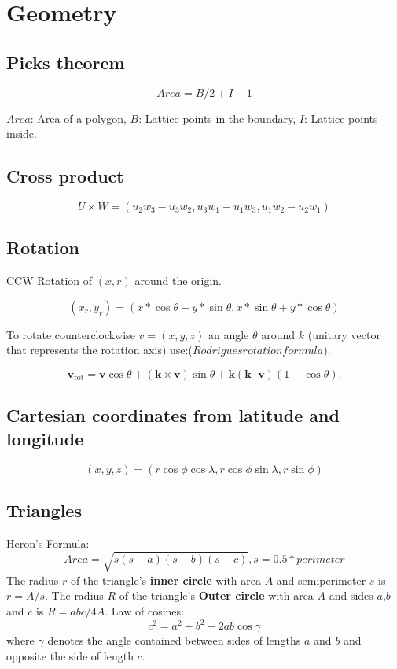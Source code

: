 \documentclass[10pt,letterpaper,twocolumn,twosided]{article}
\begin{document}
\section{Geometry}

\subsection{Picks theorem}

\[ Area = B/2 + I - 1 \]

$Area$: Area of a polygon, $B$: Lattice points in the boundary, $I$: Lattice points inside.


\subsection{Cross product}

\[ U \times W = (u_2 w_3 - u_3 w_2, u_3 w_1 - u_1 w_3, u_1 w_2 - u_2 w_1) \]

\subsection{Rotation}

CCW Rotation of $(x, r)$ around the origin.

\[ ( x_r, y_r ) = ( x * \cos \theta - y * \sin \theta, x * \sin \theta + y * \cos \theta ) \]

To rotate counterclockwise $v = (x,y,z)$ an angle $\theta$ around $k$ (unitary vector that represents the rotation axis) use:($Rodrigues rotation formula$).

\[ \mathbf{v}_\mathrm{rot} = \mathbf{v} \cos\theta + (\mathbf{k} \times \mathbf{v})\sin\theta
  + \mathbf{k} (\mathbf{k} \cdot \mathbf{v}) (1 - \cos\theta).\]
  
\subsection{Cartesian coordinates from latitude and longitude}

\[ ( x, y, z ) = ( r \cos \phi \cos \lambda, r \cos \phi \sin \lambda, r \sin \phi ) \]

\subsection{Triangles}

Heron's Formula:
\[ Area = \sqrt{s (s - a) (s - b) (s - c)}, s = 0.5 * perimeter \]
The radius $r$ of the triangle's \textbf{inner circle} with area $A$ and semiperimeter $s$ is $r = A/s$.
The radius $R$ of the triangle's \textbf{Outer circle} with area $A$ and sides $a$,$b$ and $c$ is $R = abc/4A$.
Law of cosines:
\[ c^2 = a^2 + b^2 - 2ab \cos \gamma\]
where $\gamma$ denotes the angle contained between sides of lengths $a$ and $b$ and opposite the side of length $c$.
\end{document}
